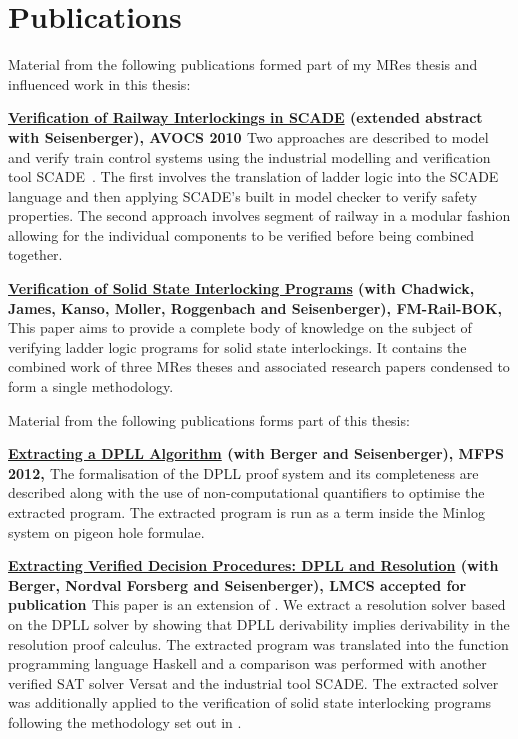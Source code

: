\section{Publications}
Material from the following publications formed part of my MRes thesis and influenced work in this thesis:

\textbf{\ul{Verification of Railway Interlockings in SCADE} (extended abstract with Seisenberger), AVOCS 2010 \cite{AL10}} 
Two approaches are described to model and verify train control systems using the industrial modelling and verification tool SCADE~\cite{Scade}. The first involves the translation of ladder logic into the SCADE language and then applying SCADE's built in model checker to verify safety properties. The second approach involves segment of railway in a modular fashion allowing for the individual components to be verified before being combined together.


\textbf{\ul{Verification of Solid State Interlocking Programs} (with Chadwick, James, Kanso, Moller, Roggenbach and Seisenberger), FM-Rail-BOK, \cite{AL14a}}
This paper aims to provide a complete body of knowledge on the subject of verifying ladder logic programs for solid state interlockings. It contains the combined work of three MRes theses and associated research papers condensed to form a single methodology.

Material from the following publications forms part of this thesis:

\textbf{\ul{Extracting a DPLL Algorithm} (with Berger and Seisenberger), MFPS 2012, \cite{AL12}}
The formalisation of the DPLL proof system and its completeness are described along with the use of non-computational quantifiers to optimise the extracted program. The extracted program is run as a term inside the Minlog system on pigeon hole formulae.


\textbf{\ul{Extracting Verified Decision Procedures: DPLL and Resolution} (with Berger, Nordval Forsberg and Seisenberger), LMCS accepted for publication \cite{AL14b}}
This paper is an extension of \cite{AL12}. We extract a resolution solver based on the DPLL solver by showing that DPLL derivability implies derivability in the resolution proof calculus. The extracted program was translated into the function programming language Haskell and a comparison was performed with another verified SAT solver Versat and the industrial tool SCADE. The extracted solver was additionally applied to the verification of solid state interlocking programs following the methodology set out in \cite{AL14a}.



